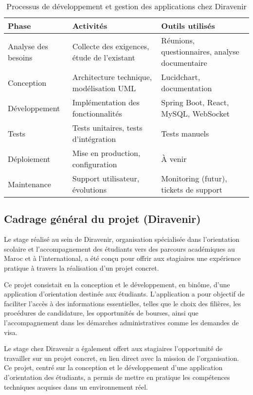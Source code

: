 \documentclass[12pt,a4paper]{report}
\begin{document}
\begin{table}[H]
\centering
\begin{tabular}{|p{3.5cm}|p{5cm}|p{5cm}|}
\hline
\textbf{Phase} & \textbf{Activités} & \textbf{Outils utilisés} \\
\hline
Analyse des besoins & Collecte des exigences, étude de l'existant & Réunions, questionnaires, analyse documentaire \\
\hline
Conception & Architecture technique, modélisation UML & Lucidchart, documentation \\
\hline
Développement & Implémentation des fonctionnalités & Spring Boot, React, MySQL, WebSocket \\
\hline
Tests & Tests unitaires, tests d'intégration & Tests manuels \\
\hline
Déploiement & Mise en production, configuration & À venir \\
\hline
Maintenance & Support utilisateur, évolutions & Monitoring (futur), tickets de support \\
\hline
\end{tabular}
\caption{Processus de développement et gestion des applications chez Diravenir}
\end{table}

\subsection{Cadrage général du projet (Diravenir)}

Le stage réalisé au sein de Diravenir, organisation spécialisée dans l'orientation scolaire et l'accompagnement des étudiants vers des parcours académiques au Maroc et à l'international, a été conçu pour offrir aux stagiaires une expérience pratique à travers la réalisation d'un projet concret.

Ce projet consistait en la conception et le développement, en binôme, d'une application d'orientation destinée aux étudiants. L'application a pour objectif de faciliter l'accès à des informations essentielles, telles que le choix des filières, les procédures de candidature, les opportunités de bourses, ainsi que l'accompagnement dans les démarches administratives comme les demandes de visa.

Le stage chez Diravenir a également offert aux stagiaires l'opportunité de travailler sur un projet concret, en lien direct avec la mission de l'organisation. Ce projet, centré sur la conception et le développement d'une application d'orientation des étudiants, a permis de mettre en pratique les compétences techniques acquises dans un environnement réel.
\end{document}
